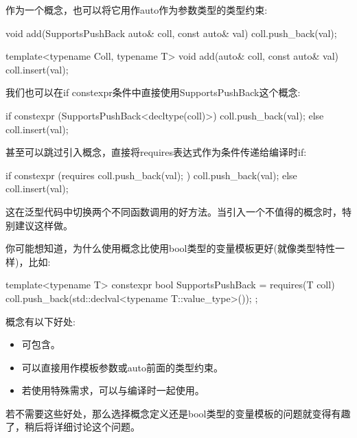 作为一个概念，也可以将它用作auto作为参数类型的类型约束:

\begin{cpp}
void add(SupportsPushBack auto& coll, const auto& val)
{
	coll.push_back(val);
}

template<typename Coll, typename T>
void add(auto& coll, const auto& val)
{
	coll.insert(val);
}
\end{cpp}


我们也可以在if constexpr条件中直接使用SupportsPushBack这个概念:

\begin{cpp}
if constexpr (SupportsPushBack<decltype(coll)>) {
	coll.push_back(val);
}
else {
	coll.insert(val);
}
\end{cpp}


甚至可以跳过引入概念，直接将requires表达式作为条件传递给编译时if:

\begin{cpp}
if constexpr (requires { coll.push_back(val); }) {
	coll.push_back(val);
}
else {
	coll.insert(val);
}
\end{cpp}

这在泛型代码中切换两个不同函数调用的好方法。当引入一个不值得的概念时，特别建议这样做。


你可能想知道，为什么使用概念比使用bool类型的变量模板更好(就像类型特性一样)，比如:

\begin{cpp}
template<typename T>
constexpr bool SupportsPushBack = requires(T coll) {
	coll.push_back(std::declval<typename T::value_type>());
};
\end{cpp}

概念有以下好处:

\begin{itemize}
\item
可包含。

\item
可以直接用作模板参数或auto前面的类型约束。

\item
若使用特殊需求，可以与编译时一起使用。
\end{itemize}

若不需要这些好处，那么选择概念定义还是bool类型的变量模板的问题就变得有趣了，稍后将详细讨论这个问题。


